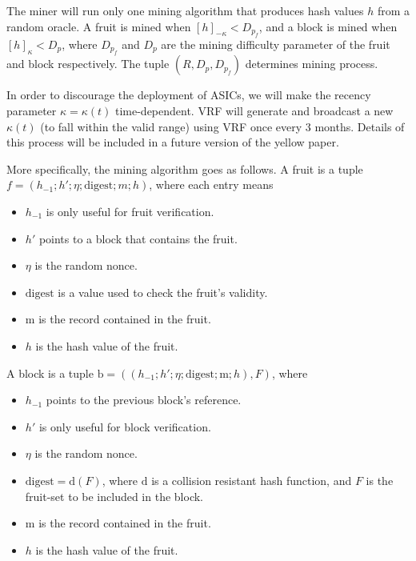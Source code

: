 The miner will run only one mining algorithm that produces hash values $h$ from a random oracle. A fruit is mined when $[h]_{-\kappa} < D_{p_f}$, and a block is mined when $[h]_{\kappa} < D_{p}$, where $D_{p_f}$ and $D_p$ are the mining difficulty parameter of the fruit and block respectively. The tuple $(R, D_p, D_{p_f})$ determines mining process. 

In order to discourage the deployment of ASICs, we will make the recency parameter $\kappa = \kappa (t)$ time-dependent. VRF will generate and broadcast a new $\kappa (t)$ (to fall within the valid range) using VRF once every 3 months. Details of this process will be included in a future version of the yellow paper. 


More specifically, the mining algorithm goes as follows. A fruit is a tuple $f = (h_{-1}; h'; \eta ; \mathrm{digest}; m; h)$, where each entry means

\begin{itemize}
	\item $h_{-1}$ is only useful for fruit verification.
	
	\item $h'$ points to a block that contains the fruit.
	
	\item $\eta$ is the random nonce. 
	
	\item $\mathrm{digest}$ is a value used to check the fruit's validity. 
	
	\item $\mathrm{m}$ is the record contained in the fruit.
	
	\item $h$ is the hash value of the fruit.	
\end{itemize}

A block is a tuple $\mathrm{b} = ((h_{-1}; h'; \eta; \mathrm{digest}; \mathrm{m}; h), F)$, where 
\begin{itemize}
	\item $h_{-1}$ points to the previous block's reference.
	
	\item $h'$ is only useful for block verification. 
	
	\item $\eta$ is the random nonce. 
	
	\item $\mathrm{digest} = \mathrm{d}(F)$, where $\mathrm{d}$ is a collision resistant hash function, and $F$ is the fruit-set to be included in the block. 
	
	\item $\mathrm{m}$ is the record contained in the fruit.
	
	\item $h$ is the hash value of the fruit.	
\end{itemize}

